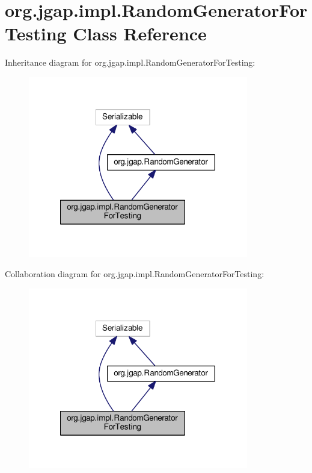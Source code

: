 \hypertarget{classorg_1_1jgap_1_1impl_1_1_random_generator_for_testing}{\section{org.\-jgap.\-impl.\-Random\-Generator\-For\-Testing Class Reference}
\label{classorg_1_1jgap_1_1impl_1_1_random_generator_for_testing}
}


Inheritance diagram for org.\-jgap.\-impl.\-Random\-Generator\-For\-Testing\-:
\nopagebreak
\begin{figure}[H]
\begin{center}
\leavevmode
\includegraphics[width=272pt]{classorg_1_1jgap_1_1impl_1_1_random_generator_for_testing__inherit__graph}
\end{center}
\end{figure}


Collaboration diagram for org.\-jgap.\-impl.\-Random\-Generator\-For\-Testing\-:
\nopagebreak
\begin{figure}[H]
\begin{center}
\leavevmode
\includegraphics[width=272pt]{classorg_1_1jgap_1_1impl_1_1_random_generator_for_testing__coll__graph}
\end{center}
\end{figure}
